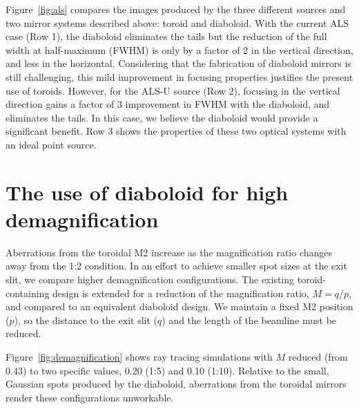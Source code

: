 \documentclass[preprint]{iucr}       %
\begin{document}
Figure~\ref{fig:als} compares the images produced by the three different sources and two mirror systems described above: toroid and diaboloid. With the current ALS case (Row 1), the diaboloid eliminates the tails but the reduction of the full width at half-maximum (FWHM) is only by a factor of 2 in the vertical direction, and less in the horizontal. Considering that the fabrication of diaboloid mirrors is still challenging, this mild improvement in focusing properties justifies the present use of toroids. However, for the ALS-U source (Row 2), focusing in the vertical direction gains a factor of 3 improvement in FWHM with the diaboloid, and eliminates the tails. In this case, we believe the diaboloid would provide a significant benefit. Row 3 shows the properties of these two optical systems with an ideal point source.

\section{The use of diaboloid for high demagnification}
\label{sec:scan}

Aberrations from the toroidal M2 increase as the magnification ratio changes away from the 1:2 condition. In an effort to achieve smaller spot sizes at the exit slit, we compare higher demagnification configurations. The existing toroid-containing design is extended for a reduction of the magnification ratio, $M=q/p$, and compared to an equivalent diaboloid design. We maintain a fixed M2 position ($p$), so the distance to the exit slit ($q$) and the length of the beamline must be reduced.

Figure~\ref{fig:demagnification} shows ray tracing simulations with $M$ reduced (from 0.43) to two specific values, 0.20 (1:5) and 0.10 (1:10). Relative to the small, Gaussian spots produced by the diaboloid, aberrations from the toroidal mirrors render these configurations unworkable.
\end{document}
